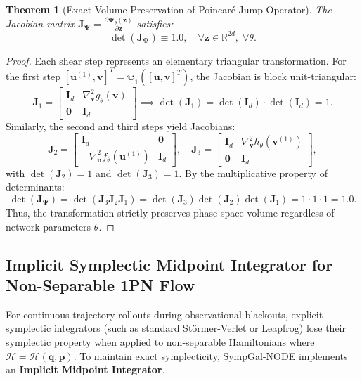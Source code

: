 \documentclass[preprint,12pt,3p]{elsarticle}
\newtheorem{theorem}{Theorem}
\begin{document}
\begin{theorem}[Exact Volume Preservation of Poincaré Jump Operator]
The Jacobian matrix $\bm{J}_{\bm{\Psi}} = \frac{\partial \bm{\Psi}_{\theta}(\bm{z})}{\partial \bm{z}}$ satisfies:
\begin{equation}
\det(\bm{J}_{\bm{\Psi}}) \equiv 1.0, \quad \forall \bm{z} \in \mathbb{R}^{2d}, \; \forall \theta.
\end{equation}
\end{theorem}
\begin{proof}
Each shear step represents an elementary triangular transformation. For the first step $[\bm{u}^{(1)}, \bm{v}]^T = \bm{\psi}_1([\bm{u}, \bm{v}]^T)$, the Jacobian is block unit-triangular:
\begin{equation}
\bm{J}_1 = \begin{bmatrix} \bm{I}_d & \nabla_{\bm{v}}^2 g_{\theta}(\bm{v}) \\ \bm{0} & \bm{I}_d \end{bmatrix} \implies \det(\bm{J}_1) = \det(\bm{I}_d) \cdot \det(\bm{I}_d) = 1.
\end{equation}
Similarly, the second and third steps yield Jacobians:
\begin{equation}
\bm{J}_2 = \begin{bmatrix} \bm{I}_d & \bm{0} \\ -\nabla_{\bm{u}}^2 f_{\theta}(\bm{u}^{(1)}) & \bm{I}_d \end{bmatrix}, \quad \bm{J}_3 = \begin{bmatrix} \bm{I}_d & \nabla_{\bm{v}}^2 h_{\theta}(\bm{v}^{(1)}) \\ \bm{0} & \bm{I}_d \end{bmatrix},
\end{equation}
with $\det(\bm{J}_2) = 1$ and $\det(\bm{J}_3) = 1$. By the multiplicative property of determinants:
\begin{equation}
\det(\bm{J}_{\bm{\Psi}}) = \det(\bm{J}_3 \bm{J}_2 \bm{J}_1) = \det(\bm{J}_3) \det(\bm{J}_2) \det(\bm{J}_1) = 1 \cdot 1 \cdot 1 = 1.0.
\end{equation}
Thus, the transformation strictly preserves phase-space volume regardless of network parameters $\theta$.
\end{proof}

\subsection{Implicit Symplectic Midpoint Integrator for Non-Separable 1PN Flow}
For continuous trajectory rollouts during observational blackouts, explicit symplectic integrators (such as standard Störmer-Verlet or Leapfrog) lose their symplectic property when applied to non-separable Hamiltonians where $\mathcal{H} = \mathcal{H}(\bm{q}, \bm{p})$. To maintain exact symplecticity, SympGal-NODE implements an \textbf{Implicit Midpoint Integrator}.
\end{document}
